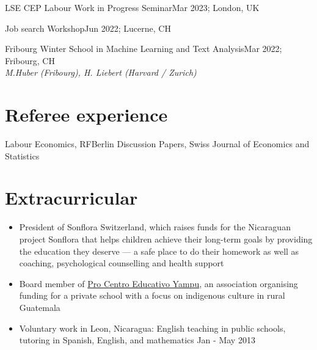\documentclass[letter, 11pt]{res}
\begin{document}
\begin{resume}
LSE CEP Labour Work in Progress Seminar\hfill Mar 2023; London, UK

Job search Workshop\hfill Jun 2022; Lucerne, CH

Fribourg Winter School in Machine Learning and Text Analysis\hfill Mar 2022; Fribourg, CH\\
\textit{M.Huber (Fribourg), H. Liebert (Harvard / Zurich)} \\


\vspace{0.5cm}
\section{Referee experience}
\vspace{1mm}
Labour Economics, RFBerlin Discussion Papers, Swiss Journal of Economics and Statistics\\

\vspace{0.5cm}
\section{Extracurricular}
\vspace{0.5cm}
\begin{itemize}[topsep=0pt]
\item [--] President of Sonflora Switzerland, which raises funds for the Nicaraguan project Sonflora that helps children achieve their long-term goals by providing the education they deserve --- a safe place to do their homework as well as coaching, psychological counselling and health support

\item [--]Board member of \href{https://ceyampu.org/}{Pro Centro Educativo Yampu}, an association organising funding for a private school with a focus on indigenous culture in rural Guatemala

\item [--]Voluntary work in Leon, Nicaragua: English teaching in public schools, tutoring in Spanish, English, and mathematics \hfill Jan - May 2013
\end{itemize}



\end{resume}
\end{document}
